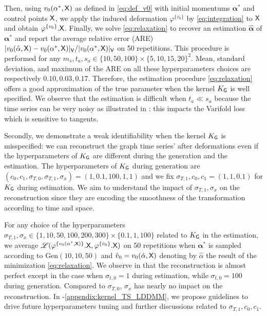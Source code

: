 Then, using $v_0(\mathbf{\alpha}^*,\mathsf{X})$ as defined in \eqref{eq:def_v0} with initial momentums $\mathbf{\alpha}^*$ and control points $\mathsf{X}$, we apply the induced deformation $\varphi^{\{v_0\}} $ by \eqref{eq:integration} to $\mathsf{X}$ and obtain $\varphi^{\{v_0\}}.\mathsf{X}$.
Finally, we solve \eqref{eq:relaxation} to recover an estimation $\hat{\mathbf{\alpha}}$ of $\mathbf{\alpha}^*$ and report the average relative error (ARE) $|v_0(\hat{\mathbf{\alpha}},\mathsf{X})-v_0(\mathbf{\alpha}^*,\mathsf{X})|_{\mathsf{V}}/|v_0(\mathbf{\alpha}^*,\mathsf{X})|_{\mathsf{V}}$ on 50 repetitions.
This procedure is performed for any $m_{s},t_{a},s_{a}\in \{10,50,100\}\times \{5,10,15,20\}^2 $.
 Mean, standard deviation, and maximum of the ARE on all these hyperparameters choices are respectively $\mathbf{0.10, 0.03, 0.17}$.
 Therefore, the estimation procedure \eqref{eq:relaxation} offers a good approximation of the true parameter when the kernel $K_{\mathsf{G}}$ is well specified.
 We observe that the estimation is difficult when $t_a\ll s_a$ because the time series can be very noisy as illustrated in : this impacts the Varifold loss which is sensitive to tangents.
  
 Secondly, we demonstrate a weak identifiability when the kernel $K_{\mathsf{G}}$ is misspecified: we can reconstruct the graph time series' after deformations even if the hyperparameters of $K_{\mathsf{G}}$
  are different during the generation and the estimation.
   The hyperparameters of $K_{\mathsf{G}}$ during generation are $(c_0,c_1,\sigma_{T,0},\sigma_{T,1},\sigma_x)=(1,0.1,100,1,1)$ and we fix $\sigma_{T,1},c_0,c_1=(1,1,0.1) $ for $K_{\mathsf{G}}$ during estimation.
   We aim to understand the impact of $\sigma_{T,1},\sigma_x$ on the reconstruction since they are encoding the smoothness of the transformation according to time and space.  

    For any choice of the hyperparameters $\sigma_{T,1},\sigma_x\in \{1,10,50,100,200,300 \}\times \{0.1,1,100\}$ related to $K_{\mathsf{G}}$ in the estimation,
     we average $\mathscr{L}(\varphi^{\{v_0(\mathbf{\alpha}^*,\mathsf{X})\}}.\mathsf{X},\varphi^{\{\hat{v}_0\}}.\mathsf{X})$ on 50 repetitions when $\mathbf{\alpha}^*$ is sampled according to Gen$(10,10,50)$ and $\hat{v}_0=v_0(\hat{\alpha},\mathsf{X})$ denoting by $\hat{\alpha}$ the result of the minimization \eqref{eq:relaxation}.
  We observe in  that the reconstruction is almost perfect except in the case when $\sigma_{t,0}=1$ during estimation, while $ \sigma_{t,0}=100$ during generation.
   Compared to $\sigma_{T,0}$, $\sigma_x$ has nearly no impact on the reconstruction.
   In -\ref{appendix:kernel_TS_LDDMM}, we propose guidelines to drive future hyperparameters tuning and further discussions related to $\sigma_{T,1},c_0,c_1$. 
